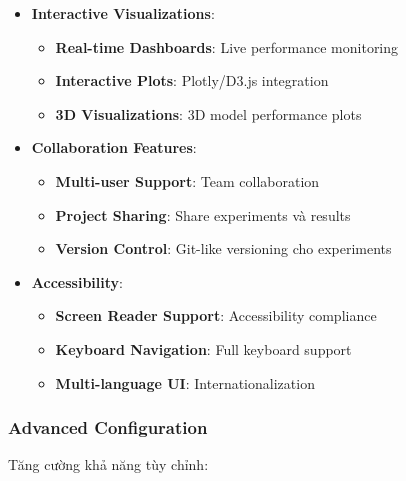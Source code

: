 \begin{itemize}
    \item \textbf{Interactive Visualizations}:
    \begin{itemize}
        \item \textbf{Real-time Dashboards}: Live performance monitoring
        \item \textbf{Interactive Plots}: Plotly/D3.js integration
        \item \textbf{3D Visualizations}: 3D model performance plots
    \end{itemize}
    
    \item \textbf{Collaboration Features}:
    \begin{itemize}
        \item \textbf{Multi-user Support}: Team collaboration
        \item \textbf{Project Sharing}: Share experiments và results
        \item \textbf{Version Control}: Git-like versioning cho experiments
    \end{itemize}
    
    \item \textbf{Accessibility}:
    \begin{itemize}
        \item \textbf{Screen Reader Support}: Accessibility compliance
        \item \textbf{Keyboard Navigation}: Full keyboard support
        \item \textbf{Multi-language UI}: Internationalization
    \end{itemize}
\end{itemize}

\subsubsection{Advanced Configuration}

Tăng cường khả năng tùy chỉnh:

